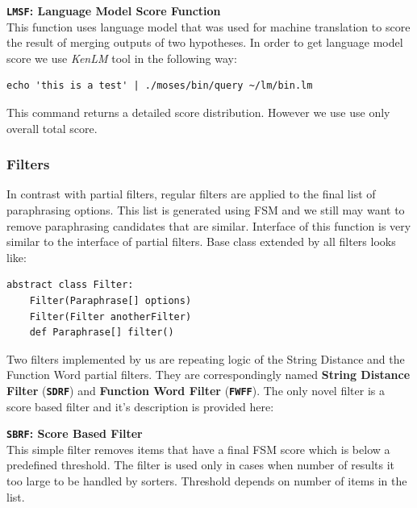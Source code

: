 \begin{flushleft}
\textbf{\texttt{LMSF}: \textbf{Language Model Score Function}} \\
This function uses language model that was used for machine translation to score the result of merging outputs of two hypotheses. In order to get language model score we use \emph{KenLM} tool in the following way:

\begin{verbatim}
echo 'this is a test' | ./moses/bin/query ~/lm/bin.lm
\end{verbatim}

This command returns a detailed score distribution. However we use use only overall total score.
\bigskip

\end{flushleft}


\subsubsection{Filters}

In contrast with partial filters, regular filters are applied to the final list of paraphrasing options. This list is generated using FSM and we still may want to remove paraphrasing candidates that are similar. Interface of this function is very similar to the interface of partial filters. Base class extended by all filters looks like:

\begin{verbatim}
abstract class Filter:
    Filter(Paraphrase[] options)
    Filter(Filter anotherFilter)
    def Paraphrase[] filter()
\end{verbatim}

Two filters implemented by us are repeating logic of the String Distance and the Function Word partial filters. They are correspondingly named \textbf{String Distance Filter} (\textbf{\texttt{SDRF}}) and \textbf{Function Word Filter} (\texttt{\textbf{FWFF}}). The only novel filter is a score based filter and it's description is provided here:


\begin{flushleft}

\textbf{\texttt{SBRF}: \textbf{Score Based Filter}} \\
This simple filter removes items that have a final FSM score which is below a predefined threshold. 
The filter is used only in cases when number of results it too large to be handled by sorters. Threshold depends on number of items in the list.
\bigskip

\end{flushleft}

